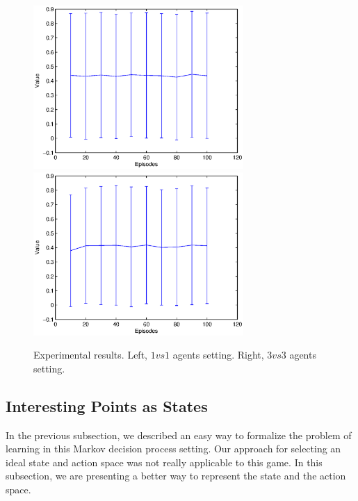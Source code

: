 \documentclass[conference]{IEEEtran}
\begin{document}
\begin{figure}[t]
\centering
    \includegraphics[width=8cm]{figures/django1vs1.eps}\	
    \includegraphics[width=8cm]{figures/django3vs3.eps}
   \caption{Experimental results. Left, $1vs1$ agents setting. Right, $3vs3$ agents setting.}
   \label{django}
\end{figure}

\subsection{Interesting Points as States}
In the previous subsection, we described an easy way to formalize the problem of learning in this Markov decision process setting. Our approach for selecting an ideal state and action space was not really applicable to this game. In this subsection, we are presenting a better way to represent the state and the action space.
\end{document}

